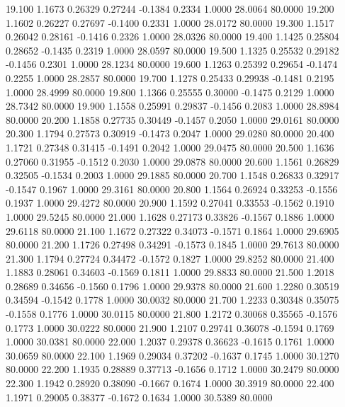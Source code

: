   19.100   1.1673   0.26329   0.27244  -0.1384   0.2334   1.0000  28.0064  80.0000
  19.200   1.1602   0.26227   0.27697  -0.1400   0.2331   1.0000  28.0172  80.0000
  19.300   1.1517   0.26042   0.28161  -0.1416   0.2326   1.0000  28.0326  80.0000
  19.400   1.1425   0.25804   0.28652  -0.1435   0.2319   1.0000  28.0597  80.0000
  19.500   1.1325   0.25532   0.29182  -0.1456   0.2301   1.0000  28.1234  80.0000
  19.600   1.1263   0.25392   0.29654  -0.1474   0.2255   1.0000  28.2857  80.0000
  19.700   1.1278   0.25433   0.29938  -0.1481   0.2195   1.0000  28.4999  80.0000
  19.800   1.1366   0.25555   0.30000  -0.1475   0.2129   1.0000  28.7342  80.0000
  19.900   1.1558   0.25991   0.29837  -0.1456   0.2083   1.0000  28.8984  80.0000
  20.200   1.1858   0.27735   0.30449  -0.1457   0.2050   1.0000  29.0161  80.0000
  20.300   1.1794   0.27573   0.30919  -0.1473   0.2047   1.0000  29.0280  80.0000
  20.400   1.1721   0.27348   0.31415  -0.1491   0.2042   1.0000  29.0475  80.0000
  20.500   1.1636   0.27060   0.31955  -0.1512   0.2030   1.0000  29.0878  80.0000
  20.600   1.1561   0.26829   0.32505  -0.1534   0.2003   1.0000  29.1885  80.0000
  20.700   1.1548   0.26833   0.32917  -0.1547   0.1967   1.0000  29.3161  80.0000
  20.800   1.1564   0.26924   0.33253  -0.1556   0.1937   1.0000  29.4272  80.0000
  20.900   1.1592   0.27041   0.33553  -0.1562   0.1910   1.0000  29.5245  80.0000
  21.000   1.1628   0.27173   0.33826  -0.1567   0.1886   1.0000  29.6118  80.0000
  21.100   1.1672   0.27322   0.34073  -0.1571   0.1864   1.0000  29.6905  80.0000
  21.200   1.1726   0.27498   0.34291  -0.1573   0.1845   1.0000  29.7613  80.0000
  21.300   1.1794   0.27724   0.34472  -0.1572   0.1827   1.0000  29.8252  80.0000
  21.400   1.1883   0.28061   0.34603  -0.1569   0.1811   1.0000  29.8833  80.0000
  21.500   1.2018   0.28689   0.34656  -0.1560   0.1796   1.0000  29.9378  80.0000
  21.600   1.2280   0.30519   0.34594  -0.1542   0.1778   1.0000  30.0032  80.0000
  21.700   1.2233   0.30348   0.35075  -0.1558   0.1776   1.0000  30.0115  80.0000
  21.800   1.2172   0.30068   0.35565  -0.1576   0.1773   1.0000  30.0222  80.0000
  21.900   1.2107   0.29741   0.36078  -0.1594   0.1769   1.0000  30.0381  80.0000
  22.000   1.2037   0.29378   0.36623  -0.1615   0.1761   1.0000  30.0659  80.0000
  22.100   1.1969   0.29034   0.37202  -0.1637   0.1745   1.0000  30.1270  80.0000
  22.200   1.1935   0.28889   0.37713  -0.1656   0.1712   1.0000  30.2479  80.0000
  22.300   1.1942   0.28920   0.38090  -0.1667   0.1674   1.0000  30.3919  80.0000
  22.400   1.1971   0.29005   0.38377  -0.1672   0.1634   1.0000  30.5389  80.0000
